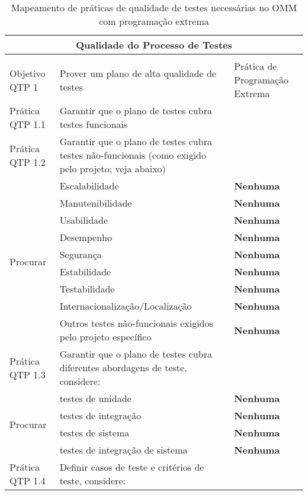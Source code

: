 \begin{longtable}{|p{2cm}|p{7cm}|p{7cm}|}
  \caption{Mapeamento de práticas de qualidade de testes necessárias
    no OMM com programação extrema} \\
  \multicolumn{3}{|c|}{\cellcolor[gray]{0.6} Qualidade do Processo de Testes}\\
  \endhead
  & & \\
  \hline \cellcolor[gray]{0.6} Objetivo QTP 1 & \cellcolor[gray]{0.6}
  Prover um plano de alta qualidade de testes & Prática de Programação Extrema \\
  \hline \cellcolor[gray]{0.9} Prática QTP 1.1 & \cellcolor[gray]{0.9}
  Garantir que o plano de testes cubra testes funcionais & \\
  \hline \cellcolor[gray]{0.9} Prática QTP 1.2 & \cellcolor[gray]{0.9}
  Garantir que o plano de testes cubra testes não-funcionais (como
  exigido pelo projeto; veja abaixo) & \\
  \hline \multirow{9}{*}{Procurar} & Escalabilidade &\textbf{Nenhuma} \\
  \cline{2-3} & Manutenibilidade &\textbf{Nenhuma} \\
  \cline{2-3} & Usabilidade &\textbf{Nenhuma} \\
  \cline{2-3} & Desempenho &\textbf{Nenhuma} \\
  \cline{2-3} & Segurança &\textbf{Nenhuma} \\
  \cline{2-3} & Estabilidade &\textbf{Nenhuma} \\
  \cline{2-3} & Testabilidade &\textbf{Nenhuma} \\
  \cline{2-3} & Internacionalização/Localização &\textbf{Nenhuma} \\
  \cline{2-3} & Outros testes não-funcionais exigidos pelo projeto
  específico &\textbf{Nenhuma} \\
  \hline \cellcolor[gray]{0.9} Prática QTP 1.3 & \cellcolor[gray]{0.9}
  Garantir que o plano de testes cubra diferentes abordagens de teste,
  considere: & \\
  \hline \multirow{4}{*}{Procurar} & testes de unidade
  & \textbf{Nenhuma} \\
  \cline{2-3} & testes de integração & \textbf{Nenhuma} \\
  \cline{2-3} & testes de sistema & \textbf{Nenhuma} \\
  \cline{2-3} & testes de integração de sistema & \textbf{Nenhuma} \\
  \hline \cellcolor[gray]{0.9} Prática QTP 1.4 & \cellcolor[gray]{0.9}
  Definir casos de teste e critérios de teste, considere: & \\

\end{longtable}
